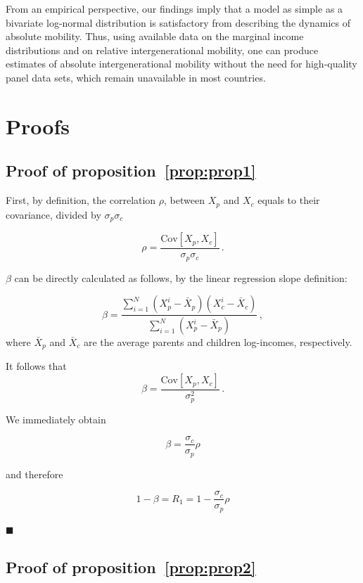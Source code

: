 \documentclass[12pt]{article}
\newcommand*{\qed}{\hfill\ensuremath{\blacksquare}}%
\newcommand{\preflong}[1]{proposition~\ref{prop:#1}}
\newcommand{\be}{\begin{equation}}
\newcommand{\ee}{\end{equation}}
\numberwithin{equation}{section}
\begin{document}
From an empirical perspective, our findings imply that a model as simple as a bivariate log-normal distribution is satisfactory from describing the dynamics of absolute mobility. Thus, using available data on the marginal income distributions and on relative intergenerational mobility, one can produce estimates of absolute intergenerational mobility without the need for high-quality panel data sets, which remain unavailable in most countries.

\clearpage

\doublespacing


\clearpage


\appendix

\section{Proofs}
\label{app:appA}

\subsection{Proof of \preflong{prop1}}

First, by definition, the correlation $\rho$, between $X_p$ and $X_c$ equals to their covariance, divided by $\sigma_p\sigma_c$

\be
\rho = \frac{\text{Cov}\left[X_p,X_c\right]}{\sigma_p\sigma_c}\,.
\ee

$\beta$ can be directly calculated as follows, by the linear regression slope definition:

\be
\beta = \frac{\sum_{i=1}^{N} {\left(X_p^i - \bar{X}_p\right)\left(X_c^i - \bar{X}_c\right)}}{\sum_{i=1}^{N} {\left(X_p^i - \bar{X}_p\right)}}\,,
\ee
where $\bar{X}_p$ and $\bar{X}_c$ are the average parents and children log-incomes, respectively.

It follows that 
\be
\beta = \frac{\text{Cov}\left[X_p,X_c\right]}{\sigma_p^2}\,.
\ee

We immediately obtain

\be
\beta = \frac{\sigma_c}{\sigma_p}\rho
\ee

and therefore

\be
1-\beta = R_1 = 1-\frac{\sigma_c}{\sigma_p}\rho
\ee

\qed

\subsection{Proof of \preflong{prop2}}
\end{document}
